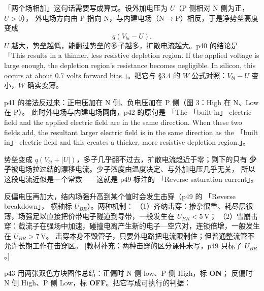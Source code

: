 \documentclass[11pt]{ctexart}
\begin{document}
「两个场相加」这句话需要写成算式。设外加电压为 $U$（P 侧相对 N 侧为正，$U>0$），
外电场方向由 P 指向 N，与内建电场（N$\to$P）相反，于是净势垒高度变成
\[
q\left(V_{bi}-U\right).
\]
$U$ 越大，势垒越低，能翻过势垒的多子越多，扩散电流越大。p40 的结论是
「This results in a thinner, less resistive depletion region. If the applied voltage is large
enough, the depletion region's resistance becomes negligible. In silicon, this occurs at about
0.7 volts forward bias.」。把它与 §3.4 的 $W$ 公式对照：$V_{bi}-U$ 变小，$W$ 确实变薄。


p41 的接法反过来：正电压加在 N 侧、负电压加在 P 侧（图 3：High 在 N、Low 在 P）。
此时外电场与内建电场\textbf{同向}，p42 的原句是 「The 「built-in」 electric field and the applied
electric field are in the same direction. When these two fields add, the resultant larger electric
field is in the same direction as the 「built in」 electric field and this creates a thicker,
more resistive depletion region.」。

势垒变成 $q(V_{bi}+|U|)$，多子几乎翻不过去，扩散电流趋近于零；剩下的只有
\textbf{少子}被电场拉过结的漂移电流。少子浓度由温度决定、与外加电压几乎无关，
所以这段电流近似是一个常数——这就是 p49 标注的 「Reverse saturation current」。

反偏电压再加大，结内场强升高到某个值时会发生击穿（p49 的 「Reverse breakdown」，
横轴标 $U_{BR}$）。两种机制：
（1）齐纳击穿：掺杂很重、耗尽层很薄，场强足以直接把价带电子隧道到导带，一般发生在 $U_{BR}<5\,\mathrm{V}$；
（2）雪崩击穿：载流子在强场中加速，碰撞电离产生新的电子—空穴对，连锁倍增，一般发生在 $U_{BR}>7\,\mathrm{V}$。
击穿本身不毁管子，只要外电路把电流限制住；但普通整流管不允许长期工作在击穿区。
[教材补充：两种击穿的区分课件未写，p49 只标了 $U_{BR}$。]


p43 用两张双色方块图作总结：正偏时 N 侧 low、P 侧 High，标 \textbf{ON}；
反偏时 N 侧 High、P 侧 Low，标 \textbf{OFF}。把它写成可执行的判据：

\begin{center}
\begin{minipage}{0.94\linewidth}
\end{minipage}
\end{center}
\end{document}
